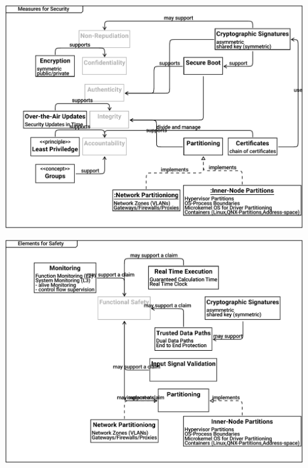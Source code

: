 \documentclass{article}
\begin{document}
\includegraphics[width= 1.0\linewidth]{quality_export/10_Measures_for_Security.pdf}


\includegraphics[width= 1.0\linewidth]{quality_export/11_Elements_for_Safety.pdf}

\end{document}
